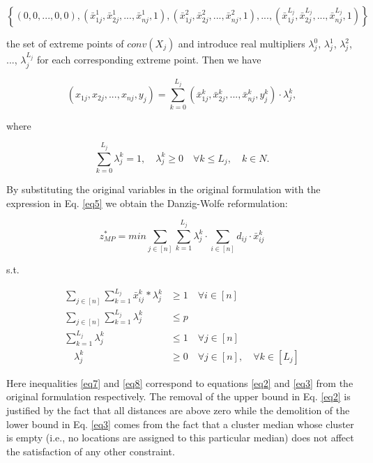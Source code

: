 \documentclass[
	11pt,
	DIV10,
	ngerman,
	a4paper,
	oneside,
	headings=normal,
	captions=tableheading,
	final,
	numbers=noenddot
]{scrartcl}
\begin{document}
\begin{equation}
	\left\{(0, 0, ..., 0, 0), (\bar{x}_{1j}^{1}, \bar{x}_{2j}^{1}, ..., \bar{x}_{nj}^{1}, 1), (\bar{x}_{1j}^{2}, \bar{x}_{2j}^{2}, ..., \bar{x}_{nj}^{2}, 1), ..., (\bar{x}_{1j}^{L_{j}}, \bar{x}_{2j}^{L_{j}}, ..., \bar{x}_{nj}^{L_{j}}, 1)\right\} \nonumber
\end{equation}

the set of extreme points of $ conv(X_{j}) $ and introduce real multipliers $ \lambda_{j}^{0} $, $ \lambda_{j}^{1} $, $ \lambda_{j}^{2} $, ..., $ \lambda_{j}^{L_{j}} $ for each corresponding extreme point. Then we have

\begin{equation}
	\label{eq5}
	(x_{1j}, x_{2j}, ..., x_{nj}, y_{j}) = \sum_{k = 0}^{L_{j}} (\bar{x}_{1j}^{k}, \bar{x}_{2j}^{k}, ..., \bar{x}_{nj}^{k}, y_{j}^{k}) \cdot \lambda_{j}^{k},
\end{equation}

where

\begin{equation}
	\sum_{k = 0}^{L_{j}} \lambda_{j}^{k} = 1, \quad \lambda_{j}^{k} \geq 0 \quad \forall k \leq L_{j}, \quad k \in N. \nonumber
\end{equation}

By substituting the original variables in the original formulation with the expression in Eq. \eqref{eq5} we obtain the Danzig-Wolfe reformulation:

\begin{equation}
	\label{eq6}
	z_{MP}^{*} = min \sum_{j \in [n]} \sum_{k = 1}^{L_{j}} \lambda_{j}^{k} \cdot \sum_{i \in [n]} d_{ij} \cdot \bar{x}_{ij}^{k}
\end{equation}

s.t.

\begin{align}
	\label{eq7} \sum_{j \in [n]} \sum_{k = 1}^{L_{j}} \bar{x}_{ij}^{k} * \lambda_{j}^{k} &\geq 1 \quad \forall i \in [n] \\[1em]
	\label{eq8} \sum_{j \in [n]} \sum_{k = 1}^{L_{j}} \lambda_{j}^{k} &\leq p \\[1em]
	\label{eq9} \sum_{k = 1}^{L_{j}} \lambda_{j}^{k} &\leq 1 \quad \forall j \in [n] \\[1em]
	\quad \lambda_{j}^{k} &\geq 0 \quad \forall j \in [n], \quad \forall k \in [L_{j}] \nonumber
\end{align}

Here inequalities \eqref{eq7} and \eqref{eq8} correspond to equations \eqref{eq2} and \eqref{eq3} from the original formulation respectively. The removal of the upper bound in Eq. \eqref{eq2} is justified by the fact that all distances are above zero while the demolition of the lower bound in Eq. \eqref{eq3} comes from the fact that a cluster median whose cluster is empty (i.e., no locations are assigned to this particular median) does not affect the satisfaction of any other constraint.
\end{document}
